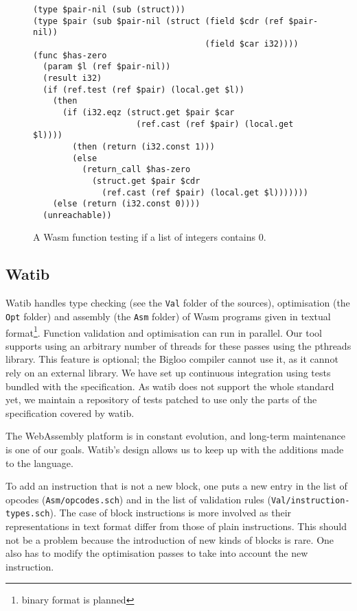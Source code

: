 \documentclass[a4paper,11pt]{article}
\begin{document}
\begin{figure}[h]
  \begin{minipage}{\widthof{(type \$pair (sub \$pair-nil (struct (field \$cdr (ref \$pair-nil))}}
\begin{lstlisting}
(type $pair-nil (sub (struct)))
(type $pair (sub $pair-nil (struct (field $cdr (ref $pair-nil))
                                   (field $car i32))))
(func $has-zero
  (param $l (ref $pair-nil))
  (result i32)
  (if (ref.test (ref $pair) (local.get $l))
    (then
      (if (i32.eqz (struct.get $pair $car
                     (ref.cast (ref $pair) (local.get $l))))
        (then (return (i32.const 1)))
        (else
          (return_call $has-zero
            (struct.get $pair $cdr
              (ref.cast (ref $pair) (local.get $l)))))))
    (else (return (i32.const 0))))
  (unreachable))
\end{lstlisting}
  \end{minipage}

  \caption{A Wasm function testing if a list of integers contains 0.}\label{ex}
\end{figure}

\subsection{Watib}
\textsf{Watib} handles type checking (see the \texttt{Val} folder of the
sources), optimisation (the \texttt{Opt} folder) and assembly (the \texttt{Asm}
folder) of Wasm programs given in textual format\footnote{binary format is
planned}. Function validation and optimisation can run in parallel. Our tool
supports using an arbitrary number of threads for these passes using the
\textsf{pthreads} library. This feature is optional; the Bigloo compiler cannot
use it, as it cannot rely on an external library. We have set up continuous
integration using tests bundled with the specification. As \textsf{watib} does
not support the whole standard yet, we maintain a repository of tests patched to
use only the parts of the specification covered by \textsf{watib}.

The WebAssembly platform is in constant evolution, and long-term maintenance is
one of our goals. \textsf{Watib}'s design allows us to keep up with the
additions made to the language.

To add an instruction that is not a new block, one puts a new entry in the list
of opcodes (\texttt{Asm/opcodes.sch}) and in the list of validation rules
(\texttt{Val/instruction-types.sch}). The case of block instructions is more
involved as their representations in text format differ from those of plain
instructions. This should not be a problem because the introduction of new kinds
of blocks is rare. One also has to modify the optimisation passes to take into
account the new instruction.
\end{document}
